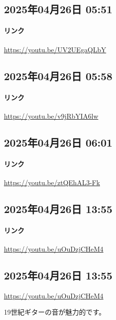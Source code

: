 \subsection*{2025年04月26日 05:51}

\paragraph{リンク}
\url{https://youtu.be/UV2UEgaQLbY}

\subsection*{2025年04月26日 05:58}

\paragraph{リンク}
\url{https://youtu.be/v9jRbYIA6lw}

\subsection*{2025年04月26日 06:01}

\paragraph{リンク}
\url{https://youtu.be/ztQEhAL3-Fk}

\subsection*{2025年04月26日 13:55}

\paragraph{リンク}
\url{https://youtu.be/uOuDzjCHeM4}

\subsection*{2025年04月26日 13:55}

\url{https://youtu.be/uOuDzjCHeM4}

19世紀ギターの音が魅力的です。

